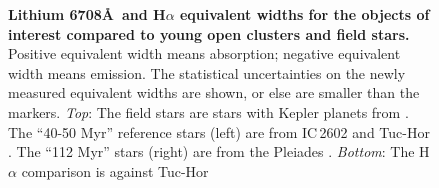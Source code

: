 \documentclass[12pt,twocolumn]{aastex63}
\begin{document}
\begin{figure}[tp]
	\begin{center}
		\leavevmode

	\end{center}
	\vspace{-0.3cm}
	\caption{
    {\bf Lithium 6708\AA\ and H$\alpha$ equivalent widths for the
    objects of interest compared to young open clusters and field
    stars. } Positive equivalent width means absorption; negative
    equivalent width means emission.  The statistical uncertainties on
    the newly measured equivalent widths are shown, or else are
    smaller than the markers.
    {\it Top}:
    The field stars are stars with Kepler planets from
    \citet{berger_identifying_2018}.  The ``40-50 Myr'' reference
    stars (left) are from IC\,2602 \citep{randich_gaiaeso_2018} and
    Tuc-Hor \citep{kraus_stellar_2014}.  The ``112 Myr'' stars (right)
    are from the Pleiades
    \citep{soderblom_evolution_1993,jones_evolution_1996,bouvier_pleiades_lirot_2018}.
    {\it Bottom}:
    The H$\alpha$ comparison is against Tuc-Hor
    \citep[$\approx$$40$\,Myr;][]{kraus_stellar_2014}
    \label{fig:lithium}
	}
\end{figure}
\end{document}
